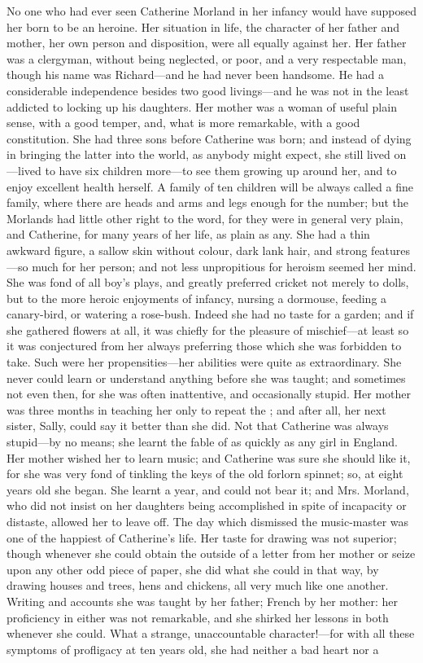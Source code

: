 No one who had ever seen Catherine Morland in her infancy would have supposed her born to be an heroine. Her situation in life, the character of her father and mother, her own person and disposition, were all equally against her. Her father was a clergyman, without being neglected, or poor, and a very respectable man, though his name was Richard---and he had never been handsome. He had a considerable independence besides two good livings---and he was not in the least addicted to locking up his daughters. Her mother was a woman of useful plain sense, with a good temper, and, what is more remarkable, with a good constitution. She had three sons before Catherine was born; and instead of dying in bringing the latter into the world, as anybody might expect, she still lived on---lived to have six children more---to see them growing up around her, and to enjoy excellent health herself. A family of ten children will be always called a fine family, where there are heads and arms and legs enough for the number; but the Morlands had little other right to the word, for they were in general very plain, and Catherine, for many years of her life, as plain as any. She had a thin awkward figure, a sallow skin without colour, dark lank hair, and strong features---so much for her person; and not less unpropitious for heroism seemed her mind. She was fond of all boy's plays, and greatly preferred cricket not merely to dolls, but to the more heroic enjoyments of infancy, nursing a dormouse, feeding a canary-bird, or watering a rose-bush. Indeed she had no taste for a garden; and if she gathered flowers at all, it was chiefly for the pleasure of mischief---at least so it was conjectured from her always preferring those which she was forbidden to take. Such were her propensities---her abilities were quite as extraordinary. She never could learn or understand anything before she was taught; and sometimes not even then, for she was often inattentive, and occasionally stupid. Her mother was three months in teaching her only to repeat the ; and after all, her next sister, Sally, could say it better than she did. Not that Catherine was always stupid---by no means; she learnt the fable of  as quickly as any girl in England. Her mother wished her to learn music; and Catherine was sure she should like it, for she was very fond of tinkling the keys of the old forlorn spinnet; so, at eight years old she began. She learnt a year, and could not bear it; and Mrs. Morland, who did not insist on her daughters being accomplished in spite of incapacity or distaste, allowed her to leave off. The day which dismissed the music-master was one of the happiest of Catherine's life. Her taste for drawing was not superior; though whenever she could obtain the outside of a letter from her mother or seize upon any other odd piece of paper, she did what she could in that way, by drawing houses and trees, hens and chickens, all very much like one another. Writing and accounts she was taught by her father; French by her mother: her proficiency in either was not remarkable, and she shirked her lessons in both whenever she could. What a strange, unaccountable character!---for with all these symptoms of profligacy at ten years old, she had neither a bad heart nor a 